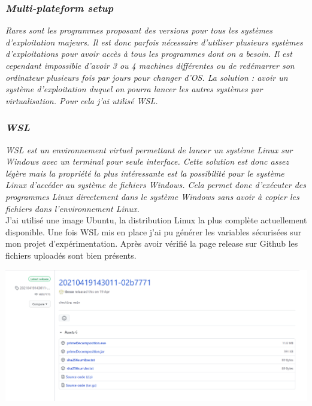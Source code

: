 \documentclass[french,a4paper,12pt]{report}
\begin{document}
\subsubsection{\textit{Multi-plateform setup}}

\textit{Rares sont les programmes proposant des versions pour tous les systèmes d’exploitation majeurs. Il est donc parfois nécessaire d’utiliser plusieurs systèmes d’exploitations pour avoir accès à tous les programmes dont on a besoin. Il est cependant impossible d’avoir 3 ou 4 machines différentes ou de redémarrer son ordinateur plusieurs fois par jours pour changer d’OS. La solution : avoir un système d’exploitation duquel on pourra lancer les autres systèmes par virtualisation. Pour cela j’ai utilisé WSL.}

\subsubsection{\textit{WSL}}

\textit{WSL est un environnement virtuel permettant de lancer un système Linux sur Windows avec un terminal pour seule interface. Cette solution est donc assez légère mais la propriété la plus intéressante est la possibilité pour le système Linux d’accéder au système de fichiers Windows. Cela permet donc d’exécuter des programmes Linux directement dans le système Windows sans avoir à copier les fichiers dans l’environnement Linux.}\\

J’ai utilisé une image Ubuntu, la distribution Linux la plus complète actuellement disponible. Une fois WSL mis en place j’ai pu générer les variables sécurisées sur mon projet d'expérimentation. Après avoir vérifié la page release sur Github les fichiers uploadés sont bien présents.

\begin{center}
  \includegraphics[width=\textwidth]{ressources/images/github.png}
\end{center}
\end{document}
